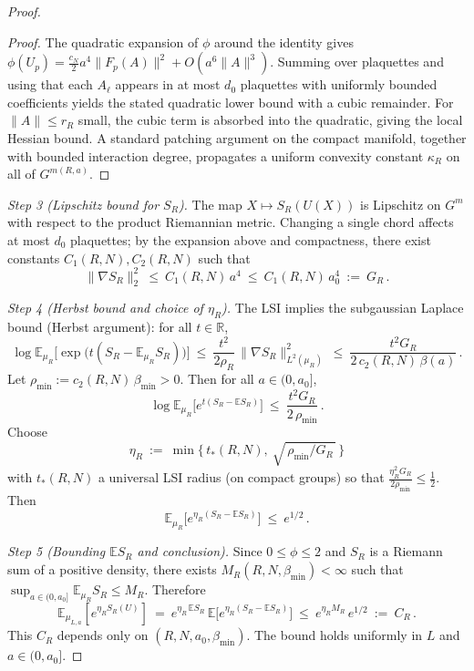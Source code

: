 \documentclass[11pt]{amsart}
\theoremstyle{plain}
\theoremstyle{definition}
\theoremstyle{remark}
\begin{document}
\begin{proof}
\begin{proof}
The quadratic expansion of $\phi$ around the identity gives $\phi(U_p)= \tfrac{c_N}{2} a^4\|F_p(A)\|^2+O(a^6\|A\|^3)$. Summing over plaquettes and using that each $A_\ell$ appears in at most $d_0$ plaquettes with uniformly bounded coefficients yields the stated quadratic lower bound with a cubic remainder. For $\|A\|\le r_R$ small, the cubic term is absorbed into the quadratic, giving the local Hessian bound. A standard patching argument on the compact manifold, together with bounded interaction degree, propagates a uniform convexity constant $\kappa_R$ on all of $G^{m(R,a)}$.
\end{proof}

\emph{Step 3 (Lipschitz bound for $S_R$).} The map $X\mapsto S_R(U(X))$ is Lipschitz on $G^{m}$ with respect to the product Riemannian metric. Changing a single chord affects at most $d_0$ plaquettes; by the expansion above and compactness, there exist constants $C_1(R,N),C_2(R,N)$ such that
\[
  \|\nabla S_R\|_2^2\ \le\ C_1(R,N)\,a^4\ \le\ C_1(R,N)\,a_0^4\ :=\ G_R\,.
\]

\emph{Step 4 (Herbst bound and choice of $\eta_R$).} The LSI implies the subgaussian Laplace bound (Herbst argument): for all $t\in\mathbb{R}$,
\[
  \log\mathbb{E}_{\mu_R}\big[\exp\big(t(S_R-\mathbb{E}_{\mu_R}S_R)\big)\big]
  \ \le\ \frac{t^2}{2\rho_R}\,\|\nabla S_R\|_{L^2(\mu_R)}^2
  \ \le\ \frac{t^2 G_R}{2\,c_2(R,N)\,\beta(a)}\,.
\]
Let $\rho_{\min}:=c_2(R,N)\,\beta_{\min}>0$. Then for all $a\in(0,a_0]$,
\[
  \log\mathbb{E}_{\mu_R}\big[e^{t(S_R-\mathbb{E}S_R)}\big]\ \le\ \frac{t^2 G_R}{2\,\rho_{\min}}\,.
\]
Choose
\[
  \eta_R\ :=\ \min\Big\{\,t_*(R,N),\ \sqrt{\,\rho_{\min}/G_R\,}\,\Big\}
\]
with $t_*(R,N)$ a universal LSI radius (on compact groups) so that $\frac{\eta_R^2 G_R}{2\rho_{\min}}\le \tfrac12$. Then
\[
  \mathbb{E}_{\mu_R}\big[e^{\eta_R(S_R-\mathbb{E}S_R)}\big]\ \le\ e^{1/2}\,.
\]

\emph{Step 5 (Bounding $\mathbb{E}S_R$ and conclusion).} Since $0\le\phi\le 2$ and $S_R$ is a Riemann sum of a positive density, there exists $M_R(R,N,\beta_{\min})<\infty$ such that $\sup_{a\in(0,a_0]}\mathbb{E}_{\mu_R}S_R\le M_R$. Therefore
\[
  \mathbb{E}_{\mu_{L,a}}\!\left[e^{\eta_R S_R(U)}\right]
  \ =\ e^{\eta_R\,\mathbb{E}S_R}\,\mathbb{E}\big[e^{\eta_R(S_R-\mathbb{E}S_R)}\big]
  \ \le\ e^{\eta_R M_R}\,e^{1/2}
  \ :=\ C_R\,.
\]
This $C_R$ depends only on $(R,N,a_0,\beta_{\min})$. The bound holds uniformly in $L$ and $a\in(0,a_0]$.
\end{proof}
\end{document}
